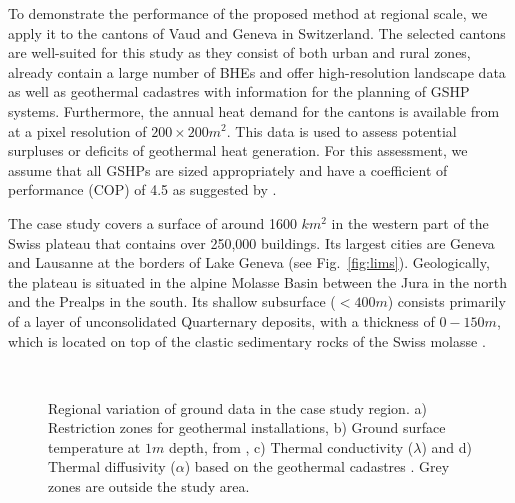 To demonstrate the performance of the proposed method at regional scale, we apply it to the cantons of Vaud and Geneva in Switzerland. 
The selected cantons are well-suited for this study as they consist of both urban and rural zones, already contain a large number of BHEs
and offer high-resolution landscape data as well as geothermal cadastres with information for the planning of GSHP systems.
Furthermore, the annual heat demand for the cantons is available from \citet{schneider_spatialtemporal_2017} at a pixel resolution of $200 \times 200 m^2$. 
This data is used to assess potential surpluses or deficits of geothermal heat generation.
For this assessment, we assume that all GSHPs are sized appropriately and have a coefficient of performance (COP) of 4.5 as suggested by \citet{galgaro_empirical_2015}.

The case study covers a surface of around 1600 $km^2$ in the western part of the Swiss plateau that contains over 250,000 buildings. 
Its largest cities are Geneva and Lausanne at the borders of Lake Geneva (see Fig.~\ref{fig:lims}).
Geologically, the plateau is situated in the alpine Molasse Basin between the Jura in the north and the Prealps in the south. 
Its shallow subsurface ($< 400m$) consists primarily of a layer of unconsolidated Quarternary deposits, with a thickness of $0 - 150m$, which is located on top of the clastic sedimentary rocks of the Swiss molasse \cite{allenbach_geomol_2105}. %

\begin{figure}[!ht] %
\centering
{} \\
\caption{Regional variation of ground data in the case study region. a) Restriction zones for geothermal installations, b) Ground surface temperature at $1m$ depth, from \citet{assouline_machine_2019}, c) Thermal conductivity ($\lambda$) and d) Thermal diffusivity ($\alpha$) based on the geothermal cadastres \cite{asit_vd_cadastre_2019, sitg_cadastre_2019}. Grey zones are outside the study area.}
\label{fig:data}
\end{figure}

